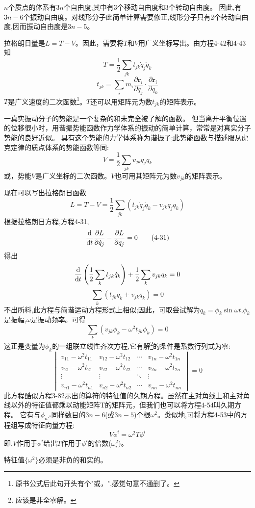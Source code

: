 $n$个质点的体系有$3n$个自由度;其中有$3$个移动自由度和$3$个转动自由度。
因此,有$3n-6$个振动自由度。对线形分子此简单计算需要修正,线形分子只有$2$个转动自由度,因而振动自由度是$3n-5$。

拉格朗日量是$L=T-V$。因此，需要将$T$和$V$用广义坐标写出。由方程4-42和4-43知
\[T=\frac{1}{2}\sum_{jk}t_{jk}\dot{q}_j\dot{q}_k \tag{4-42}\]
\[t_{jk}=\sum_im_i\frac{\partial \mathbf{r}_i}{\partial q_j} \cdot \frac{\partial \mathbf{r}_i}{\partial q_k} \tag{4-43}\]
$T$是广义速度的二次函数\footnote{原书公式后此句开头有个"或，",感觉句意不通删了。}。$T$还可以用矩阵元为数$t_{jk}$的矩阵表示。

一真实振动分子的势能是一个复杂的和未完全被了解的函数。
但当离开平衡位置的位移很小时，用谐振势能函数作力学体系的振动的简单计算，常常是对真实分子势能的良好近似。
具有这个势能的力学体系称为谐振子;此势能函数与描述服从虎克定律的质点体系的势能函数等同:
\[V=\frac{1}{2}\sum_{jk}v_{jk}q_jq_k \tag{4-50}\]
或，势能$V$是广义坐标的二次函数。$V$也可用其矩阵元为数$v_{jk}$的矩阵表示。

现在可以写出拉格朗日函数
\[L=T-V=\frac{1}{2}\sum_{jk}(t_{jk}\dot{q}_j\dot{q}_k-v_{jk}q_jq_k) \tag{4-51}\]
根据拉格朗日方程,方程4-31,
\[\dv{t}\frac{\partial L}{\partial \dot{q}_j}-\frac{\partial L}{\partial q_j}=0 \tag{4-31}\]
得出
\[\dv{t}\left(\frac{1}{2}\sum_kt_{jk}\dot{q}_k\right)+\frac{1}{2}\sum_kv_{jk}q_k=0\]
\[\sum_k(t_{jk}\ddot{q}_k+v_{jk}q_k)=0 \tag{4-52}\]
不出所料,此方程与简谐运动方程形式上相似;因此，可取尝试解为$q_k=\phi_k\sin\omega t$,$\phi_k$是振幅,$\omega$是振动频率。可得
\[\sum_k\left(v_{jk}\phi_k-\omega^2t_{jk}\phi_k\right)=0 \tag{4-53}\]
这正是变量为$\phi_k$的一组联立线性齐次方程,它有解\footnote{应该是非全零解。}的条件是系数行列式为零:
\[
\begin{vmatrix}
    v_{11}-\omega^2t_{11} & v_{12}-\omega^2t_{12} & \cdots & v_{1n}-\omega^2t_{1n} \\
    v_{21}-\omega^2t_{21} & v_{22}-\omega^2t_{22} & \cdots & v_{2n}-\omega^2t_{2n} \\
    \vdots & \vdots & \ddots & \vdots \\
    v_{n1}-\omega^2t_{n1} & v_{n2}-\omega^2t_{n2} & \cdots & v_{nn}-\omega^2t_{nn}
\end{vmatrix} 
=0 \tag{4-54}   
\]
此方程酷似方程3-82示出的算符的特征值的久期方程。虽然在主对角线上和主对角线以外的特征值都乘以动能矩阵T的矩阵元，但我们也可以将方程4-54叫久期方程。
它有与$\phi_{n'^s}$同样数目的$3n-6$(或$3n-5$)个根$\omega^2$。类似地,可将方程4-53中的方程组写成特征向量方程:
\[V\phi^i=\omega^2T\phi^i \tag{4-55}\]
即,$V$作用于$\phi^i$给出$T$作用于$\phi^i$的倍数($\omega_i^2$)。
\begin{theorem}
    特征值$\{\omega^2\}$必须是非负的和实的。
\end{theorem}

